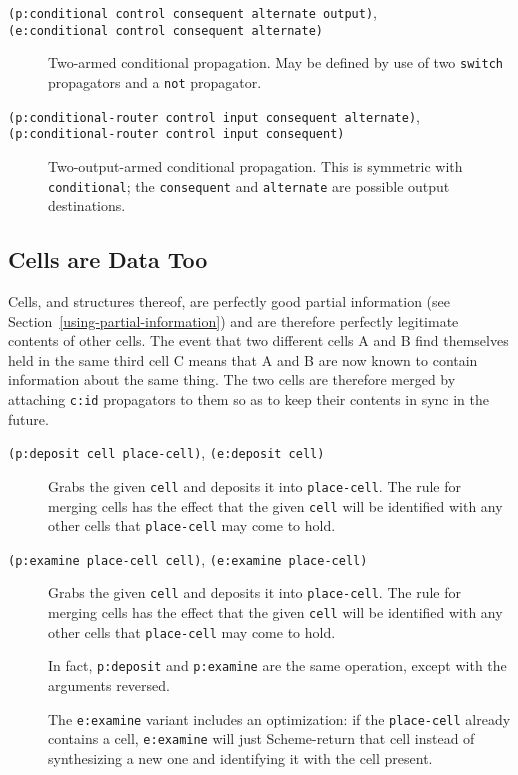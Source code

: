 \documentclass[12pt,letterpaper,english]{article}
\begin{document}
\begin{description}
\item[{\texttt{(p:conditional control consequent alternate output)},}]
\item[{\texttt{(e:conditional control consequent alternate)}}] \leavevmode 
Two-armed conditional propagation.  May be defined by use of two
\texttt{switch} propagators and a \texttt{not} propagator.

\item[{\texttt{(p:conditional-router control input consequent alternate)},}]
\item[{\texttt{(p:conditional-router control input consequent)}}] \leavevmode 
Two-output-armed conditional propagation.  This is symmetric with
\texttt{conditional}; the \texttt{consequent} and \texttt{alternate} are possible
output destinations.

\end{description}



\subsection{Cells are Data Too}
\label{cells-are-data-too}

Cells, and structures thereof, are perfectly good partial information
(see Section~\ref{using-partial-information})
and are therefore perfectly legitimate contents of other
cells.  The event that two different cells A and B find themselves
held in the same third cell C means that A and B are now known to
contain information about the same thing.  The two cells are therefore
merged by attaching \texttt{c:id} propagators to them so as to keep their
contents in sync in the future.
\begin{description}
\item[{\texttt{(p:deposit cell place-cell)}, \texttt{(e:deposit cell)}}] \leavevmode 
Grabs the given \texttt{cell} and deposits it into \texttt{place-cell}.  The
rule for merging cells has the effect that the given \texttt{cell} will
be identified with any other cells that \texttt{place-cell} may come to
hold.

\item[{\texttt{(p:examine place-cell cell)}, \texttt{(e:examine place-cell)}}] \leavevmode 
Grabs the given \texttt{cell} and deposits it into \texttt{place-cell}.  The
rule for merging cells has the effect that the given \texttt{cell} will
be identified with any other cells that \texttt{place-cell} may come to
hold.

In fact, \texttt{p:deposit} and \texttt{p:examine} are the same operation,
except with the arguments reversed.

The \texttt{e:examine} variant includes an optimization: if the
\texttt{place-cell} already contains a cell, \texttt{e:examine} will just
Scheme-return that cell instead of synthesizing a new one and
identifying it with the cell present.

\end{description}
\end{document}
